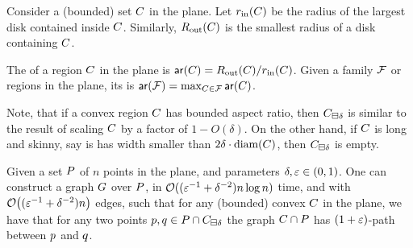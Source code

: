 \documentclass[12pt]{article}%
\begin{document}
\begin{defn}
    Consider a (bounded) set $C$ in the plane. Let $\rinX{\body}$
    be the radius of the largest disk contained inside $C$.
    Similarly, $\routX{\body}$ is the smallest radius of a disk
    containing $C$.

    The  of a region $C$ in the plane is
    $\arX{\body} = \routX{\body}/\rinX{\body}$. Given a family $\mathcal{F}$
    or regions in the plane, its  is
    $\arX{\FF} = \max_{\body \in \FF} \arX{\body}$.
\end{defn}

Note, that if a convex region $C$ has bounded aspect ratio, then
$C_{\boxminus \delta}$ is similar to the result of scaling $C$
by a factor of $1-O(\delta)$. On the other hand, if $C$ is long
and skinny, say is has width smaller than
$2 \delta \cdot \diameterX{\body}$, then $C_{\boxminus \delta}$ is
empty.


\begin{lemma}
    Given a set $P$ of $n$ points in the plane, and parameters
    $\delta, \varepsilon \in (0,1)$.  One can construct a graph $G$ over
    $P$, in $\mathcal{O}( (\varepsilon^{-1} + \delta^{-2}) n \log n)$ time, and
    with $\mathcal{O}\bigl( (\varepsilon^{-1} + \delta^{-2}) n \bigr) $ edges, such
    that for any (bounded) convex $C$ in the plane, we have that
    for any two points
    $p, q \in P \cap C_{\boxminus \delta}$ the graph
    $C  \cap {P}$ has $(1+\varepsilon)$-path between $p$ and
    $q$.
\end{lemma}
\end{document}
